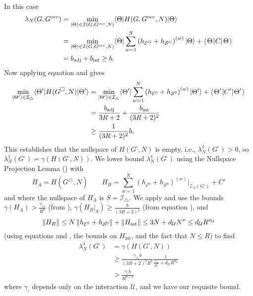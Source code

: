 \documentclass[../thesis-main/thesis-main]{subfiles}
\begin{document}
In this case 
\begin{align}
\lambda_{N}(G,G^{\text{occ}})&=\min_{|\Theta\rangle\in\mathcal{I}(G,G^{\text{occ}},N)}\langle\Theta|H(G,G^{\text{occ}},N)|\Theta\rangle\\
   & = \min_{|\Theta\rangle\in\mathcal{I}(G,G^{\text{occ}},N)}\langle\Theta|\sum_{w=1}^{N}\left(h_{\mathcal{E}^{G}}+h_{\mathcal{S}^{G}}\right)^{(w)}|\Theta\rangle + \langle\mspace{2mu} \Theta \mspace{2mu} | C |\mspace{2mu} \Theta \mspace{2mu} \rangle\\
   &= b_{\text{adj}} + b_{\text{int}} \geq  b.
\end{align}
 Now applying equation  and  gives
\begin{align}
  \min_{|\Theta^{\prime}\rangle\in\mathcal{I}_{\triangle}}\langle\Theta^{\prime}|H(G^{\square},N)|\Theta^{\prime}\rangle&=\min_{|\Theta^{\prime}\rangle\in\mathcal{I}_{\triangle}}\langle\Theta^{\prime}|\sum_{w=1}^{N}\left(h_{\mathcal{E}^{0}}+h_{\mathcal{S}^{0}}\right)^{(w)}|\Theta^{\prime}\rangle + \langle\mspace{2mu} \Theta' \mspace{2mu} | C' |\mspace{2mu} \Theta' \mspace{2mu} \rangle\\
  &= \frac{b_{\text{adj}}}{3R+2} + \frac{b_{\text{int}}}{(3R+2)^2}\\
  &\geq\frac{1}{(3R+2)^2}b,\label{eq:bound_thetaprime}
\end{align}
This establishes that the nullspace of $H(G^{\square},N)$ is empty, i.e., $\lambda_{N}^{1}(G^{\square})>0$, so $\lambda_{N}^{1}(G^{\square})=\gamma(H(G^{\square},N))$. We lower bound $\lambda_{N}^{1}(G^{\square})$ using the Nullspace Projection Lemma () with
\begin{equation}
  H_{A}=H(G^{\triangle},N)\qquad H_{B}=\sum_{w=1}^{N}\left(h_{\mathcal{E}^{0}}+h_{\mathcal{S}^{0}}\right)^{(w)}\bigg|_{\mathcal{Z}_{N}(G^{\square})} + C'
\end{equation}
and where the nullspace of $H_{A}$ is $S=\mathcal{I}_{\triangle}$. We apply  and use the bounds $\gamma(H_{A})>\frac{\gamma_\triangle}{R^{7}}$ (from ), $\gamma(H_{B}|_{S})\geq\frac{b}{(3R+2)^2}$ (from equation ), and 
\begin{equation}
  \left\Vert H_{B}\right\Vert \leq N\left\Vert {h_{\mathcal{E}^{0}}+h_{\mathcal{S}^{0}}}\right\Vert  + \|{H_{\text{int}}}\| \leq3N + d_{\mathcal{U}} N^{\nu}
  \leq d_{\mathcal{U}}R^{\nu_\mathcal{U}}
\end{equation}
(using equations  and , the bounds on $H_{\text{int}}$, and the fact that $N\leq R$) to find 
\begin{align}
\lambda_{N}^{1}(G^{\square}) &= \gamma(H(G^{\square},N)) \\
 &\geq \frac{\gamma_{\triangle}b}{(3R+2)^2R^7}\frac{1}{\frac{\gamma_{\triangle}}{R^7}+d_{\mathcal{U}} R^{\nu_{\mathcal{U}}}} \\
 & >\frac{ \gamma_{\square} b}{R^{9+\nu}}
\end{align}
where $\gamma_{\square}$ depends only on the interaction $\mathcal{U}$, and we have our requisite bound.
\end{document}

